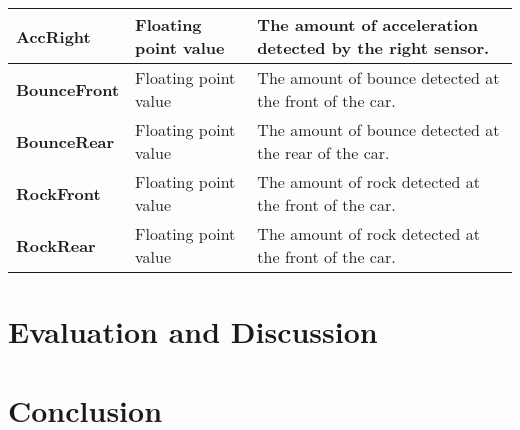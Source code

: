 \documentclass[a4paper,11pt]{article}
\begin{document}
\begin{table}[h]
{\begin{tabular}{ | l | l | l | }
\textbf{AccRight}       & Floating point value                   & The amount of acceleration detected by the right sensor.  \\ \hline
\textbf{BounceFront}    & Floating point value                   & The amount of bounce detected at the front of the car.  \\ \hline
\textbf{BounceRear}     & Floating point value                   & The amount of bounce detected at the rear of the car.  \\ \hline
\textbf{RockFront}      & Floating point value                   & The amount of rock detected at the front of the car.  \\ \hline
\textbf{RockRear}       & Floating point value                   & The amount of rock detected at the front of the car.  \\ \hline

\end{tabular}}
\end{table}




\newpage

\section{Evaluation and Discussion} %
\label{sec:evaluation_and_discussion}



\newpage

\section{Conclusion} %
\label{sec:conclusion}


\newpage                            %



\end{document}

